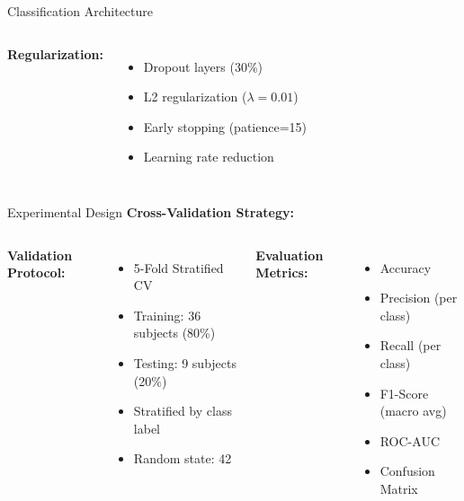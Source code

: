 \documentclass[aspectratio=169]{beamer}
\begin{document}
\begin{frame}{Classification Architecture}
\begin{columns}[c]
\textbf{Regularization:}
\begin{itemize}
    \item Dropout layers (30\%)
    \item L2 regularization ($\lambda=0.01$)
    \item Early stopping (patience=15)
    \item Learning rate reduction
\end{itemize}
\end{columns}
\end{frame}

\begin{frame}{Experimental Design}
\textbf{Cross-Validation Strategy:}

\begin{center}
\end{center}

\vspace{3mm}

\begin{columns}[c]
\textbf{Validation Protocol:}
\begin{itemize}
    \item 5-Fold Stratified CV
    \item Training: 36 subjects (80\%)
    \item Testing: 9 subjects (20\%)
    \item Stratified by class label
    \item Random state: 42
\end{itemize}

\textbf{Evaluation Metrics:}
\begin{itemize}
    \item Accuracy
    \item Precision (per class)
    \item Recall (per class)
    \item F1-Score (macro avg)
    \item ROC-AUC
    \item Confusion Matrix
\end{itemize}
\end{columns}
\end{frame}
\end{document}
